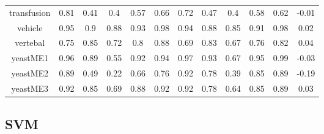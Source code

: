 \documentclass{article}%
\begin{document}
\begin{tabular}{|c|c|c|c|c|c|c|c|c|c|c|c|}
transfusion&0.81&0.41&0.4&0.57&0.66&0.72&0.47&0.4&0.58&0.62&{-}0.01\\%
vehicle&0.95&0.9&0.88&0.93&0.98&0.94&0.88&0.85&0.91&0.98&0.02\\%
vertebal&0.75&0.85&0.72&0.8&0.88&0.69&0.83&0.67&0.76&0.82&0.04\\%
yeastME1&0.96&0.89&0.55&0.92&0.94&0.97&0.93&0.67&0.95&0.99&{-}0.03\\%
yeastME2&0.89&0.49&0.22&0.66&0.76&0.92&0.78&0.39&0.85&0.89&{-}0.19\\%
yeastME3&0.92&0.85&0.69&0.88&0.92&0.92&0.78&0.64&0.85&0.89&0.03\\%
\hline%
\end{tabular}

%
\subsection*{SVM}%
\end{document}
